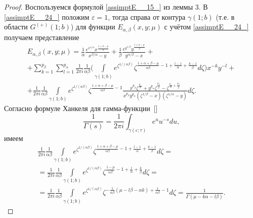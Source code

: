 {\begin{proof}
Воспользуемся формулой \eqref{assimptE__15_} из леммы 3. В \eqref{assimptE__24_} положим
$\varepsilon =1$, тогда справа от контура $\gamma (1; b)$ (т.е.
в области $G^{(+)} (1; b)$) для функции
$E_{\alpha, \beta }  (x, y; \mu)$ с учётом  \eqref{assimptE__24_} получаем
представление
\begin{multline}
\label{assimptE__25_}
E_{\alpha ,\beta }  (x, y; \mu)=\frac{1}{\alpha } \frac{e^{x^{1/ \alpha}  } x^{\frac{1+\beta -\mu }{\alpha } } }{x^{\beta /\alpha} -y} +\frac{1}{\beta } \frac{e^{y^{1/\beta} } y^{\frac{1+\alpha -\mu }{\beta } } }{y^{\alpha/\beta}  -x} +
\\
+\sum _{k=1}^{p_{\beta } }\sum _{l=1}^{p_{\alpha } }\frac{1}{2\pi i} \frac{1}{\alpha \beta } \biggl(\int\limits_{\gamma (1; b)}e^{\zeta ^{1/(\alpha \beta)} }   \zeta ^{\frac{1+\alpha +\beta -\mu }{\alpha \beta } -1+\frac{l-1}{\alpha } +\frac{k-1}{\beta } } d\zeta  \biggr)x^{-k} y^{-l}+
\\
+\frac{1}{2\pi i} \frac{1}{\alpha \beta } \int\limits_{\gamma (1; b)}e^{\zeta ^{1/(\alpha \beta)} }   \zeta ^{\frac{1+\alpha +\beta -\mu }{\alpha \beta } -1} \frac{x^{p_{\beta } } \zeta ^{\frac{p_{\alpha } }{\alpha } } +y^{p_{\alpha } } \zeta ^{\frac{p_{\beta } }{\beta } } -\zeta ^{\frac{p_{\alpha } }{\alpha } +\frac{p_{\beta } }{\beta } } }{x^{p_{\beta } } y^{p_{\alpha } } \left(\zeta ^{1/\beta} -x\right)\left(\zeta ^{1/ \alpha}  -y\right)} d \zeta .
\end{multline}
Согласно формуле Ханкеля для гамма-функции~[]
\begin{equation*}
\frac{1}{\Gamma \left(s\right)} =\frac{1}{2\pi i} \int _{\gamma (\varepsilon; \tau) }e^{u} u^{-s} du ,
\end{equation*}
имеем 
\begin{multline*}
\frac{1}{2\pi i} \frac{1}{\alpha \beta } \int\limits_{\gamma (1; b)}e^{\zeta ^{1/(\alpha \beta)} }   \zeta ^{\frac{1+\alpha +\beta -\mu }{\alpha \beta } -1+\frac{l-1}{\alpha } +\frac{k-1}{\beta } } d\zeta  = \\ = \frac{1}{2\pi i} \frac{1}{\alpha \beta } \int\limits_{\gamma (1; b)}e^{\zeta ^{1/(\alpha \beta)} }   \zeta ^{\frac{1-\mu }{\alpha \beta } -1+\frac{l}{\alpha } +\frac{k}{\beta } } d\zeta  =
\\
=\frac{1}{2\pi i} \frac{1}{\alpha \beta } \int\limits_{\gamma (1; b)}e^{\zeta ^{1/(\alpha \beta)} }   \zeta ^{-\frac{1}{\alpha \beta } \left(\mu -l\beta -\alpha k\right)+\frac{1}{\alpha \beta } -1} d\zeta  =\frac{1}{\Gamma (\mu -k\alpha -l\beta)} .
\end{multline*}

\end{proof}}
